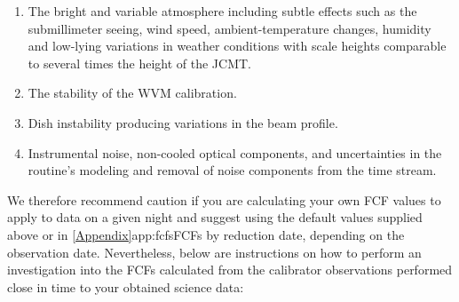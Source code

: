 \begin{enumerate}

\item The bright and variable atmosphere including subtle effects such as the
submillimeter seeing, wind speed, ambient-temperature changes, humidity and low-lying variations
in weather conditions with scale heights comparable to several times the height of the JCMT.

\item The stability of the WVM calibration.

\item Dish instability producing variations in the beam profile.

\item Instrumental noise, non-cooled optical components, and uncertainties in the {} routine's
modeling and removal of noise components from the time stream.

\end{enumerate}

We therefore recommend caution if you are calculating your own FCF
values to apply to data on a given night and suggest using the default values
supplied above or in \cref{Appendix}{app:fcfs}{FCFs by reduction date}, depending on the observation date.
Nevertheless, below are instructions on how to perform an investigation into
the FCFs calculated from the calibrator observations performed close in time
to your obtained science data:

